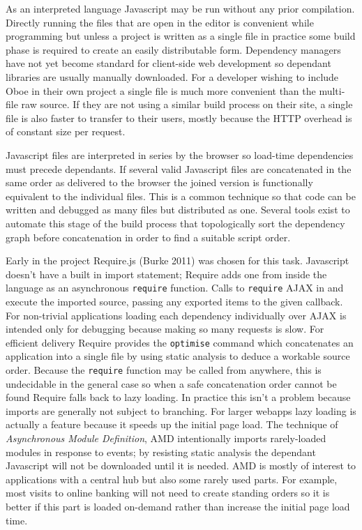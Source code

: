 \documentclass[12pt, ]{article}
\begin{document}
As an interpreted language Javascript may be run without any prior
compilation. Directly running the files that are open in the editor is
convenient while programming but unless a project is written as a single
file in practice some build phase is required to create an easily
distributable form. Dependency managers have not yet become standard for
client-side web development so dependant libraries are usually manually
downloaded. For a developer wishing to include Oboe in their own project
a single file is much more convenient than the multi-file raw source. If
they are not using a similar build process on their site, a single file
is also faster to transfer to their users, mostly because the HTTP
overhead is of constant size per request.

Javascript files are interpreted in series by the browser so load-time
dependencies must precede dependants. If several valid Javascript files
are concatenated in the same order as delivered to the browser the
joined version is functionally equivalent to the individual files. This
is a common technique so that code can be written and debugged as many
files but distributed as one. Several tools exist to automate this stage
of the build process that topologically sort the dependency graph before
concatenation in order to find a suitable script order.

Early in the project Require.js (Burke 2011) was chosen for this task.
Javascript doesn't have a built in import statement; Require adds one
from inside the language as an asynchronous \texttt{require} function.
Calls to \texttt{require} AJAX in and execute the imported source,
passing any exported items to the given callback. For non-trivial
applications loading each dependency individually over AJAX is intended
only for debugging because making so many requests is slow. For
efficient delivery Require provides the \texttt{optimise} command which
concatenates an application into a single file by using static analysis
to deduce a workable source order. Because the \texttt{require} function
may be called from anywhere, this is undecidable in the general case so
when a safe concatenation order cannot be found Require falls back to
lazy loading. In practice this isn't a problem because imports are
generally not subject to branching. For larger webapps lazy loading is
actually a feature because it speeds up the initial page load. The
technique of \emph{Asynchronous Module Definition}, AMD intentionally
imports rarely-loaded modules in response to events; by resisting static
analysis the dependant Javascript will not be downloaded until it is
needed. AMD is mostly of interest to applications with a central hub but
also some rarely used parts. For example, most visits to online banking
will not need to create standing orders so it is better if this part is
loaded on-demand rather than increase the initial page load time.
\end{document}
